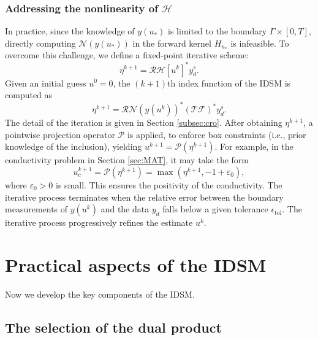 \documentclass[onefignum,onetabnum]{siamart190516}
\numberwithin{equation}{section}
\begin{document}
\subsubsection{Addressing the nonlinearity of $\mathcal{H}$}
In practice, since the knowledge of $y(u_*)$ is limited to the boundary $\Gamma \times [0,T]$, directly computing $\mathcal{N}(y(u_*))$ in the forward kernel $H_{u_*}$ is infeasible.
To overcome this challenge, we define a fixed-point iterative scheme:
\begin{equation}\label{eqn23}
\eta^{k+1} = \mathcal{R}\mathcal{H}[u^k]^* y^{s}_{d}.
\end{equation}
Given an initial guess $u^0 = 0$, the $(k+1)$th index function of the IDSM is computed as
\begin{equation*}
\eta^{k+1} = \mathcal{R} \mathcal{N}(y(u^{k}))^{*}\left(\mathcal{T}\mathcal{F}\right)^{*}y^{s}_{d}.
\end{equation*}
The detail of the iteration is given in Section \ref{subsec:cro}.
After obtaining $\eta^{k+1}$, a pointwise projection operator $\mathcal{P}$ is applied, to enforce box constraints (i.e., prior knowledge of the inclusion), yielding $u^{k+1} = \mathcal{P}(\eta^{k+1})$.
For example, in the conductivity problem in Section \ref{sec:MAT}, it may take the form
\begin{equation*}
u_{c}^{k+1} = \mathcal{P}(\eta^{k+1}) = \max(\eta^{k+1}, -1 + \varepsilon_{0}),
\end{equation*}
where $\varepsilon_{0} > 0$ is small.
This ensures the positivity of the conductivity.
The iterative process terminates when the relative error between the boundary measurements of $y(u^k)$ and the data $y_d$ falls below a given tolerance $\epsilon_{\text{tol}}$.
The iterative process progressively refines the estimate $u^k$.

\section{Practical aspects of the IDSM}\label{sec:IMP}
Now we develop the key components of the IDSM.

\subsection{The selection of the dual product}\label{subsec:sdp}
\end{document}
